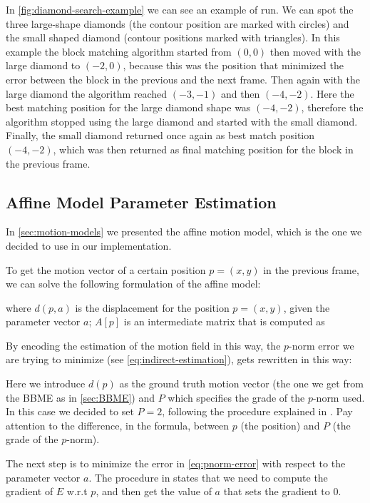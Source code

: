 In \cref{fig:diamond-search-example} we can see an example of run. We can spot the three large-shape diamonds (the contour position are marked with circles) and the small shaped diamond (contour positions marked with triangles).
In this example the block matching algorithm started from $(0,0)$ then moved with the large diamond to $(-2,0)$, because this was the position that minimized the error between the block in the previous and the next frame. Then again with the large diamond the algorithm reached $(-3,-1)$ and then $(-4,-2)$. Here the best matching position for the large diamond shape was $(-4,-2)$, therefore the algorithm stopped using the large diamond and started with the small diamond. Finally, the small diamond returned once again as best match position $(-4,-2)$, which was then returned as final matching position for the block in the previous frame.

\subsection{Affine Model Parameter Estimation}
\begin{figure}[!h]
    \removelatexerror
    
\end{figure}
In \cref{sec:motion-models} we presented the affine motion model, which is the one we decided to use in our implementation.

To get the motion vector of a certain position $p=(x,y)$ in the previous frame, we can solve the following formulation of the affine model:

where $d(p, a)$ is the displacement for the position $p = (x,y)$, given the parameter vector $a$; $A[p]$ is an intermediate matrix that is computed as 


By encoding the estimation of the motion field in this way, the $p$-norm error we are trying to minimize (see \cref{eq:indirect-estimation}), gets rewritten in this way:


Here we introduce $d(p)$ as the ground truth motion vector (the one we get from the BBME as in \cref{sec:BBME}) and $P$ which specifies the grade of the $p$-norm used. In this case we decided to set $P=2$, following the procedure explained in \cite{WangBook}. Pay attention to the difference, in the formula, between $p$ (the position) and $P$ (the grade of the $p$-norm). 

The next step is to minimize the error in \cref{eq:pnorm-error} with respect to the parameter vector $a$.
The procedure in \cite{WangBook} states that we need to compute the gradient of $E$ w.r.t $p$, and then get the value of $a$ that sets the gradient to 0.

